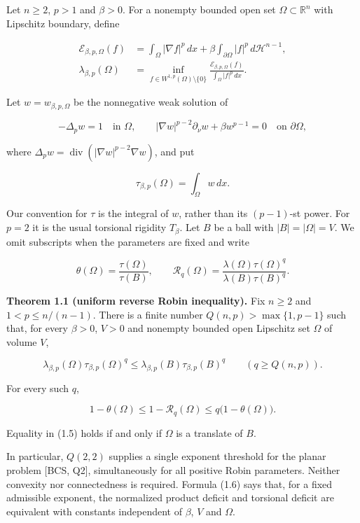 \documentclass[11pt]{article}
\begin{document}
Let \(n\geq2\), \(p>1\) and \(\beta>0\). For a nonempty bounded open set
\(\Omega\subset\mathbb R^n\) with Lipschitz boundary, define

\[\begin{aligned}
\mathcal E_{\beta,p,\Omega}(f)&=\int_\Omega|\nabla f|^p\,dx+\beta\int_{\partial\Omega}|f|^p\,d\mathcal H^{n-1},\\
\lambda_{\beta,p}(\Omega)&=\inf_{f\in W^{1,p}(\Omega)\setminus\{0\}}
\frac{\mathcal E_{\beta,p,\Omega}(f)}{\int_\Omega|f|^p\,dx}.
\end{aligned}\tag{1.1}\]

Let \(w=w_{\beta,p,\Omega}\) be the nonnegative weak solution of

\[-\Delta_p w=1\quad\text{in }\Omega,
\qquad |\nabla w|^{p-2}\partial_\nu w+\beta w^{p-1}=0
\quad\text{on }\partial\Omega,\tag{1.2}\]

where \(\Delta_p w=\operatorname{div}(|\nabla w|^{p-2}\nabla w)\), and
put

\[\tau_{\beta,p}(\Omega)=\int_\Omega w\,dx.\tag{1.3}\]

Our convention for \(\tau\) is the integral of \(w\), rather than its
\((p-1)\)-st power. For \(p=2\) it is the usual torsional rigidity
\(T_\beta\). Let \(B\) be a ball with \(|B|=|\Omega|=V\). We omit
subscripts when the parameters are fixed and write

\[\theta(\Omega)=\frac{\tau(\Omega)}{\tau(B)},\qquad
\mathcal R_q(\Omega)=\frac{\lambda(\Omega)\tau(\Omega)^q}
{\lambda(B)\tau(B)^q}.\tag{1.4}\]

\textbf{Theorem 1.1 (uniform reverse Robin inequality).} Fix \(n\geq2\)
and \(1<p\leq n/(n-1)\). There is a finite number
\(Q(n,p)>\max\{1,p-1\}\) such that, for every \(\beta>0\), \(V>0\) and
nonempty bounded open Lipschitz set \(\Omega\) of volume \(V\),

\[\lambda_{\beta,p}(\Omega)\tau_{\beta,p}(\Omega)^q
\leq\lambda_{\beta,p}(B)\tau_{\beta,p}(B)^q
\qquad(q\geq Q(n,p)).\tag{1.5}\]

For every such \(q\),

\[1-\theta(\Omega)\leq1-\mathcal R_q(\Omega)
\leq q\bigl(1-\theta(\Omega)\bigr).\tag{1.6}\]

Equality in (1.5) holds if and only if \(\Omega\) is a translate of
\(B\).

In particular, \(Q(2,2)\) supplies a single exponent threshold for the
planar problem {[}BCS, Q2{]}, simultaneously for all positive Robin
parameters. Neither convexity nor connectedness is required. Formula
(1.6) says that, for a fixed admissible exponent, the normalized product
deficit and torsional deficit are equivalent with constants independent
of \(\beta\), \(V\) and \(\Omega\).
\end{document}
